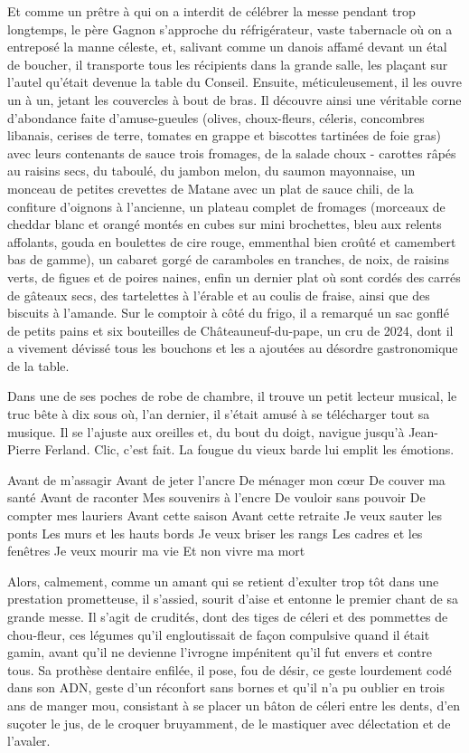 Et comme un prêtre à qui on a interdit de célébrer la messe pendant trop longtemps, le père Gagnon s’approche du réfrigérateur, vaste tabernacle où on a entreposé la manne céleste, et, salivant comme un danois affamé devant un étal de boucher, il transporte tous les récipients dans la grande salle, les plaçant sur l’autel qu’était devenue la table du Conseil. Ensuite, méticuleusement, il les ouvre un à un, jetant les couvercles à bout de bras. Il découvre ainsi une véritable corne d’abondance faite d’amuse-gueules (olives, choux-fleurs, céleris, concombres libanais, cerises de terre, tomates en grappe et biscottes tartinées de foie gras) avec leurs contenants de sauce trois fromages, de la salade choux - carottes râpés au raisins secs, du taboulé, du jambon melon, du saumon mayonnaise, un monceau de petites crevettes de Matane avec un plat de sauce chili, de la confiture d’oignons à l’ancienne, un plateau complet de fromages (morceaux de cheddar blanc et orangé montés en cubes sur mini brochettes, bleu aux relents affolants, gouda en boulettes de cire rouge, emmenthal bien croûté et camembert bas de gamme), un cabaret gorgé de caramboles en tranches, de noix, de raisins verts, de figues et de poires naines, enfin un dernier plat où sont cordés des carrés de gâteaux secs, des tartelettes à l’érable et au coulis de fraise, ainsi que des biscuits à l’amande. Sur le comptoir à côté du frigo, il a remarqué un sac gonflé de petits pains et six bouteilles de Châteauneuf-du-pape, un cru de 2024, dont il a vivement dévissé tous les bouchons et les a ajoutées au désordre gastronomique de la table.

Dans une de ses poches de robe de chambre, il trouve un petit lecteur musical, le truc bête à dix sous où, l’an dernier, il s’était amusé à se télécharger tout sa musique. Il se l’ajuste aux oreilles et, du bout du doigt, navigue jusqu’à Jean-Pierre Ferland. Clic, c’est fait. La fougue du vieux barde lui emplit les émotions.

    Avant de m’assagir
    Avant de jeter l’ancre
    De ménager mon cœur
    De couver ma santé
    Avant de raconter
    Mes souvenirs à l’encre
    De vouloir sans pouvoir
    De compter mes lauriers
    Avant cette saison
    Avant cette retraite
    Je veux sauter les ponts
    Les murs et les hauts bords
    Je veux briser les rangs
    Les cadres et les fenêtres
    Je veux mourir ma vie
    Et non vivre ma mort

Alors, calmement, comme un amant qui se retient d’exulter trop tôt dans une prestation prometteuse, il s’assied, sourit d’aise et entonne le premier chant de sa grande messe. Il s’agit de crudités, dont des tiges de céleri et des pommettes de chou-fleur, ces légumes qu’il engloutissait de façon compulsive quand il était gamin, avant qu’il ne devienne l’ivrogne impénitent qu’il fut envers et contre tous. Sa prothèse dentaire enfilée, il pose, fou de désir, ce geste lourdement codé dans son ADN, geste d’un réconfort sans bornes et qu’il n’a pu oublier en trois ans de manger mou, consistant à se placer un bâton de céleri entre les dents, d’en suçoter le jus, de le croquer bruyamment, de le mastiquer avec délectation et de l’avaler.


